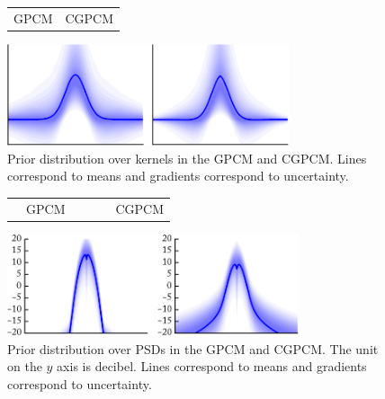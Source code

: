 \documentclass{article}
\begin{document}
\begin{figure}[t]
    \centering
    \begin{tabularx}{\linewidth}{>{\centering}X>{\centering}X}
        GPCM & CGPCM
    \end{tabularx}
    \includegraphics[width=\linewidth, height=3cm]{resources/cropped/prior.pdf}
    \caption{Prior distribution over kernels in the GPCM and CGPCM. Lines correspond to means and gradients correspond to uncertainty.}
    \label{fig:prior}
\end{figure}
\begin{figure}[t]
    \centering
    \begin{tabularx}{\linewidth}{>{\centering}X>{\centering}X}
        ~~GPCM & ~~~~~~CGPCM
    \end{tabularx}
    \includegraphics[width=\linewidth, height=3cm]{resources/cropped/prior_psd.pdf}
    \caption{Prior distribution over PSDs in the GPCM and CGPCM. The unit on the $y$ axis is decibel. Lines correspond to means and gradients correspond to uncertainty.}
    \label{fig:prior_psd}
\end{figure}
\end{document}
